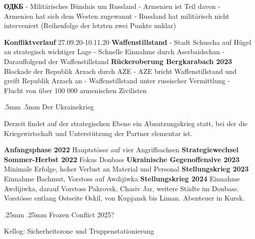 {}\documentclass[a4paper,landscape,twoside]{article}
\makeatletter
\renewcommand{\section}{\@startsection{section}{1}{\z@}%
	{.5mm}%
	{.5mm}%
	{\normalfont\normalsize\bfseries}}
\renewcommand{\subsection}{\@startsection{subsection}{2}{\z@}%
	{.25mm}%
	{.25mm}%
	{\normalfont\small\bfseries}}
\makeatother
\begin{document}
\begin{multicols}{4}
	\textbf{ОДКБ }
	- Militärisches Bündnis um Russland
	- Armenien ist Teil davon
	- Armenien hat sich dem Westen zugewannt
	- Russland hat militärisch nicht interveniert
	(Reihenfolge der letzten zwei Punkte unklar)

	\textbf{Konfliktverlauf}
	27.09.20-10.11.20
	\textbf{Waffenstillstand}
	-  Stadt Schuscha auf Hügel an strategisch wichtiger Lage
	-  Schnelle Einnahme durch Aserbaidschan
	-  Darauffolgend der Waffenstillstand
	\textbf{Rückeroberung Bergkarabach 2023}
	Blockade der Republik Arzach durch AZE -
	AZE bricht Waffenstillstand und greift Republik Arzach an -
	Waffenstillstand unter russischer Vermittlung
	- Flucht von über 100 000 armenischen Zivilisten



	\section{Der Ukrainekrieg}

	Derzeit findet auf der strategischen Ebene ein Abnutzungskrieg statt,
	bei der die Kriegswirtschaft und Unterstützung der Partner  elementar ist.


	\textbf{Anfangsphase 2022}
	Hauptstösse auf vier Angriffsachsen
	\textbf{Strategiewechsel Sommer-Herbst 2022}
	Fokus Donbass
	\textbf{Ukrainische Gegenoffensive 2023}
	Minimale Erfolge, hoher Verlust an Material und Personal
	\textbf{Stellungskrieg 2023}
	Einnahme Bachmut, Vorstoss auf Awdijiwka
	\textbf{Stellungskrieg 2024}
	Einnahme Awdijiwka, darauf Vorstoss Pakrovsk, Chasiv Jar, weitere Städte im Donbass.
	Vorstösse entlang Ostseite Oskil, von Kupjansk bis Liman.
	Abenteuer in Kursk.

	\subsection{Frozen Conflict 2025?}

	Kellog: Sicherheitszone und Truppenstationierung


\end{multicols}
\end{document}
